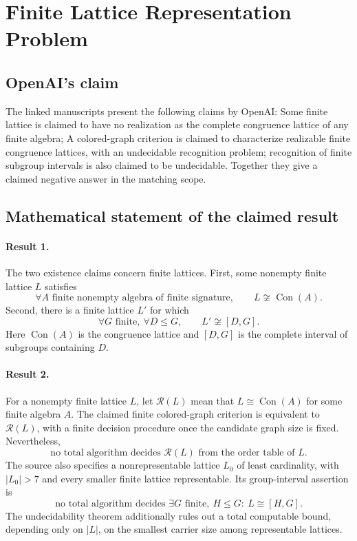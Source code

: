 \documentclass[11pt]{article}
\begin{document}
\section*{Finite Lattice Representation Problem}

\subsection{OpenAI's claim}
The linked manuscripts present the following claims by OpenAI: Some finite lattice is claimed to have no realization as the complete congruence lattice of any finite algebra; A colored-graph criterion is claimed to characterize realizable finite congruence lattices, with an undecidable recognition problem; recognition of finite subgroup intervals is also claimed to be undecidable. Together they give a claimed negative answer in the matching scope.

\subsection{Mathematical statement of the claimed result}
\paragraph{Result 1.} The two existence claims concern finite lattices. First, some nonempty finite lattice \(L\) satisfies
\[
 \forall A\text{ finite nonempty algebra of finite signature},\qquad
 L\not\cong\operatorname{Con}(A).
\]
Second, there is a finite lattice \(L'\) for which
\[
 \forall G\text{ finite},\ \forall D\le G,\qquad L'\not\cong[D,G].
\]
Here \(\operatorname{Con}(A)\) is the congruence lattice and \([D,G]\) is the complete interval of subgroups containing \(D\).

\paragraph{Result 2.} For a nonempty finite lattice \(L\), let \(\mathcal R(L)\) mean that \(L\cong\operatorname{Con}(A)\) for some finite algebra \(A\). The claimed finite colored-graph criterion is equivalent to \(\mathcal R(L)\), with a finite decision procedure once the candidate graph size is fixed. Nevertheless,
\[
 \text{no total algorithm decides }\mathcal R(L)\text{ from the order table of }L.
\]
The source also specifies a nonrepresentable lattice \(L_0\) of least cardinality, with \(|L_0|>7\) and every smaller finite lattice representable. Its group-interval assertion is
\[
 \text{no total algorithm decides }\exists G\text{ finite},\ H\le G:\ L\cong[H,G].
\]
The undecidability theorem additionally rules out a total computable bound, depending only on \(|L|\), on the smallest carrier size among representable lattices.
\end{document}
